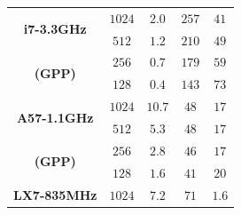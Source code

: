 \documentclass[11pt]{report}
\begin{document}
\begin{table}
{{\begin{tabular}{ccccc}
        \multirow{2}{*}{\bf i7-3.3GHz}   & $1024$ & $2.0$                                                                    & $257$                                                                     & $41$                                                                   \\
                                         & $512$  & $1.2$                                                                    & $210$                                                                     & $49$                                                                   \\
        \multirow{2}{*}{\bf (GPP)}       & $256$  & $0.7$                                                                    & $179$                                                                     & $59$                                                                   \\
                                         & $128$  & $0.4$                                                                    & $143$                                                                     & $73$                                                                   \\
        \midrule
        \multirow{2}{*}{\bf A57-1.1GHz}  & $1024$ & $10.7$                                                                   & $48$                                                                      & $17$                                                                   \\
                                         & $512$  & $5.3$                                                                    & $48$                                                                      & $17$                                                                   \\
        \multirow{2}{*}{\bf (GPP)}       & $256$  & $2.8$                                                                    & $46$                                                                      & $17$                                                                   \\
                                         & $128$  & $1.6$                                                                    & $41$                                                                      & $20$                                                                   \\
        \midrule
        \multirow{2}{*}{\bf LX7-835MHz}  & $1024$ & $7.2$                                                                    & $71$                                                                      & $1.6$                                                                  \\

\end{tabular}}}
\end{table}
\end{document}
